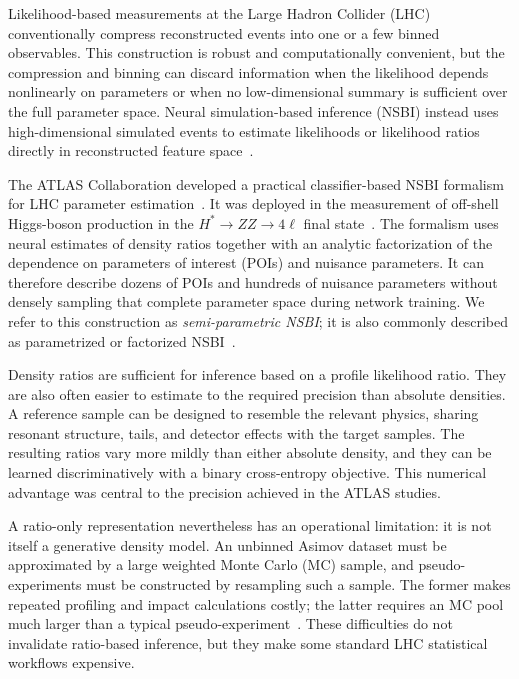\documentclass[
  aps,
  prd,
  superscriptaddress,
  nofootinbib,
  longbibliography,
  12pt
]{revtex4-2}
\begin{document}
Likelihood-based measurements at the Large Hadron Collider (LHC) conventionally compress reconstructed events into one or a few binned observables.  This construction is robust and computationally convenient, but the compression and binning can discard information when the likelihood depends nonlinearly on parameters or when no low-dimensional summary is sufficient over the full parameter space.  Neural simulation-based inference (NSBI) instead uses high-dimensional simulated events to estimate likelihoods or likelihood ratios directly in reconstructed feature space~\cite{Cranmer:2015bka,Brehmer:2018eca,Brehmer:2018hga}.

The ATLAS Collaboration developed a practical classifier-based NSBI formalism for LHC parameter estimation~\cite{ATLAS:2024rpr}.  It was deployed in the measurement of off-shell Higgs-boson production in the $H^{*}\!\to ZZ\to4\ell$ final state~\cite{ATLAS:2024tgo}.  The formalism uses neural estimates of density ratios together with an analytic factorization of the dependence on parameters of interest (POIs) and nuisance parameters.  It can therefore describe dozens of POIs and hundreds of nuisance parameters without densely sampling that complete parameter space during network training.  We refer to this construction as \emph{semi-parametric NSBI}; it is also commonly described as parametrized or factorized NSBI~\cite{Sandesara:2026lectures}.

Density ratios are sufficient for inference based on a profile likelihood ratio.  They are also often easier to estimate to the required precision than absolute densities.  A reference sample can be designed to resemble the relevant physics, sharing resonant structure, tails, and detector effects with the target samples.  The resulting ratios vary more mildly than either absolute density, and they can be learned discriminatively with a binary cross-entropy objective.  This numerical advantage was central to the precision achieved in the ATLAS studies.

A ratio-only representation nevertheless has an operational limitation: it is not itself a generative density model.  An unbinned Asimov dataset must be approximated by a large weighted Monte Carlo (MC) sample, and pseudo-experiments must be constructed by resampling such a sample.  The former makes repeated profiling and impact calculations costly; the latter requires an MC pool much larger than a typical pseudo-experiment~\cite{ATLAS:2024rpr}.  These difficulties do not invalidate ratio-based inference, but they make some standard LHC statistical workflows expensive.
\end{document}
